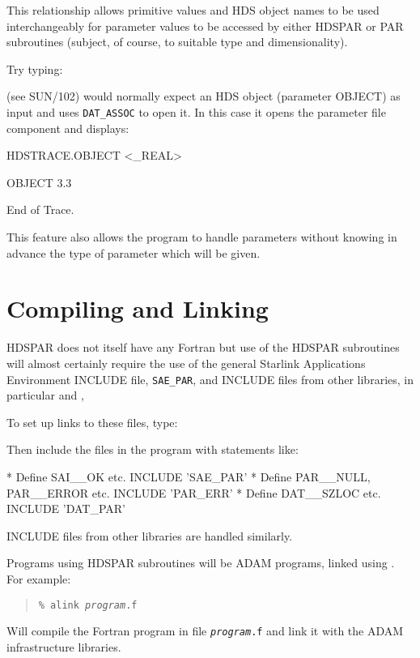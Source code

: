 \documentclass[twoside,11pt,nolof]{starlink}
\begin{document}
This relationship allows primitive values and HDS object names to be used
interchangeably for parameter values to be accessed by either HDSPAR or PAR
subroutines (subject, of course, to suitable type and dimensionality).

Try typing:
\begin{terminalv}
\end{terminalv}

 (see SUN/102)
would normally expect an HDS object (parameter OBJECT) as input and uses
\texttt{DAT\_ASSOC} to open it.
In this case it opens the parameter file component and displays:
\begin{terminalv}
HDSTRACE.OBJECT  <_REAL>

   OBJECT         3.3

End of Trace.
\end{terminalv}

This feature also allows the program to handle parameters without knowing in
advance the type of parameter which will be given.

\section{Compiling and Linking}
HDSPAR does not itself have any Fortran
but use of the HDSPAR subroutines will almost certainly require the use of
the general Starlink Applications Environment INCLUDE file, \texttt{SAE\_PAR},
and INCLUDE files from other libraries, in particular
and
,

To set up links to these files, type:
\begin{terminalv}
\end{terminalv}
Then include the files in the program with statements like:
\begin{terminalv}
*  Define SAI__OK etc.
      INCLUDE 'SAE_PAR'
*  Define PAR__NULL, PAR__ERROR etc.
      INCLUDE 'PAR_ERR'
*  Define DAT__SZLOC etc.
      INCLUDE 'DAT_PAR'
\end{terminalv}
INCLUDE files from other libraries are handled similarly.

Programs using HDSPAR subroutines will be ADAM programs, linked using
.
For example:
\begin{quote}
\texttt{\% alink \textit{program}.f}
\end{quote}
Will compile the Fortran program in file \texttt{\textit{program}.f} and link
it with the ADAM infrastructure libraries.
\end{document}
